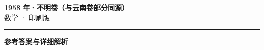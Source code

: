 \documentclass[zihao=5, a4paper]{ctexart}
\begin{document}
\begin{center}
  {\Large\bfseries 1958 年·不明卷（与云南卷部分同源）}\\[4pt]
  {\large 数学 · 印刷版}
\end{center}
\medskip
{}

\par\bigskip\hrule\bigskip
{}
\begin{center}{\large\bfseries 参考答案与详细解析}\end{center}
\smallskip

\end{document}
